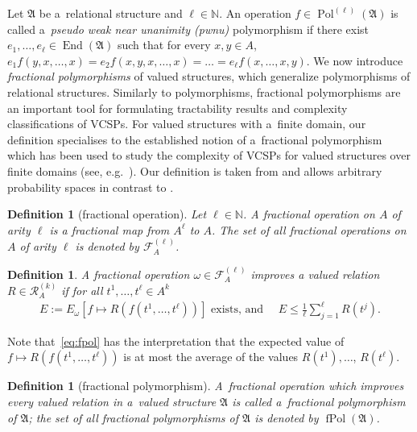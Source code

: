 \documentclass[preprint,12pt]{elsarticle}
\newcommand{\N}{\mathbb N}
\newcommand{\bA}{{\mathfrak A}}
\DeclareMathOperator{\End}{End}
\DeclareMathOperator{\fPol}{fPol}
\DeclareMathOperator{\Pol}{Pol}
\newtheorem{definition}[theorem]{Definition}
\begin{document}
Let $\bA$ be a~relational structure and $\ell \in \N$. An operation $f \in \Pol^{(\ell)}(\bA)$ is called a~\emph{pseudo weak near unanimity (pwnu)} polymorphism if there exist $e_1, \dots, e_\ell \in \End(\bA)$ such that for every $x,y \in A$, $e_1f(y,x,\dots,x) = e_2 f(x,y,x,\dots,x) = \dots = e_\ell f(x,\dots,x,y).$
We now introduce  \emph{fractional polymorphisms} of valued structures, which generalize polymorphisms of relational structures.  Similarly to polymorphisms, fractional polymorphisms are an important tool for formulating tractability results and complexity classifications of VCSPs.
For valued structures with a~finite domain, our definition specialises to the established notion of a~fractional polymorphism which has been used 
to study the complexity of VCSPs for valued structures over finite domains (see, e.g.~\cite{ThapperZivny13}). Our definition is taken from \cite{Resilience-VCSPs} and allows arbitrary probability spaces in contrast to \cite{ViolaThesis,SchneiderViola,ViolaZivny}.

\begin{definition}[fractional operation]
Let $\ell \in {\mathbb N}$. 
A \emph{fractional operation on $A$ of arity $\ell$} is
a fractional map from $A^\ell$ to $A$. 
The set of all fractional operations on $A$ of arity $\ell$ is denoted by ${\mathscr F}^{(\ell)}_A$.
\end{definition}

\begin{definition}\label{def:pres}
A fractional operation $\omega \in {\mathscr F}_A^{(\ell)}$ \emph{improves}
a valued relation $R \in {\mathscr R}^{(k)}_A$ if for all $t^1,\dots,t^{\ell} \in A^k$ 
\begin{align}
E := E_\omega[f \mapsto R(f(t^1,\dots,t^{\ell}))]
\text{ exists, and } \quad 
E \leq
\frac{1}{\ell} \sum_{j = 1}^{\ell} R(t^j). \label{eq:fpol}
\end{align}
\end{definition}

Note that~\eqref{eq:fpol} has the interpretation that 
the expected value of $f \mapsto R(f(t^1,\dots,t^\ell))$ is at most the average of the values $R(t^1),\dots$, $R(t^\ell)$. 

\begin{definition}[fractional polymorphism]
A~fractional operation which improves every valued relation in a~valued structure $\bA$ is called a~\emph{fractional polymorphism 
of $\bA$}; the set of all fractional polymorphisms of $\bA$ is denoted by $\fPol(\bA)$.
\end{definition}
\end{document}
